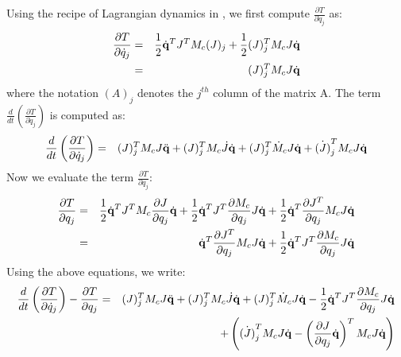 Using the recipe of Lagrangian dynamics in , we first compute $\frac{\partial T}{\partial \dot{q}_j}$ as:
\begin{eqnarray}
\nonumber
\frac{\partial T}{\partial \dot{q}_j} & = & \frac{1}{2}\dot{\mathbf{q}}^T J^T M_c (J)_j + \frac{1}{2} (J)_j^T M_c J \dot{\mathbf{q}}\\
 & = & (J)_j^T M_c J \dot{\mathbf{q}}
\end{eqnarray}
where the notation $(A)_j$ denotes the $j^{th}$ column of the matrix A. The term $\frac{d}{dt} \left( \frac{\partial T}{\partial \dot{q}_j} \right )$ is computed as:
\begin{eqnarray}
\label{eq:lagterm1}
\frac{d}{dt} \left ( \frac{\partial T}{\partial \dot{q}_j} \right ) & = & (J)_j^T M_c J \ddot{\mathbf{q}} + (J)_j^T M_c \dot{J} \dot{\mathbf{q}} + (J)_j^T \dot{M}_c J \dot{\mathbf{q}} + \dot{(J)}_j^T M_c J \dot{\mathbf{q}}
\end{eqnarray}
Now we evaluate the term $\frac{\partial T}{\partial q_j}$:
\begin{eqnarray}
\nonumber
\frac{\partial T}{\partial q_j} & = & \frac{1}{2}\dot{\mathbf{q}}^T J^T M_c \frac{\partial J}{\partial q_j} \dot{\mathbf{q}} + \frac{1}{2}\dot{\mathbf{q}}^T J^T \frac{\partial M_c}{\partial q_j} J \dot{\mathbf{q}} + \frac{1}{2}\dot{\mathbf{q}}^T \frac{\partial J^T}{\partial q_j} M_c J \dot{\mathbf{q}}\\
\label{eq:lagterm2}
& = & \dot{\mathbf{q}}^T \frac{\partial J^T}{\partial q_j} M_c J \dot{\mathbf{q}} + \frac{1}{2}\dot{\mathbf{q}}^T J^T \frac{\partial M_c}{\partial q_j} J \dot{\mathbf{q}}
\end{eqnarray}
Using the above equations, we write:
\begin{eqnarray}
\label{eq:lageqn_j}
\nonumber
\frac{d}{dt} \left ( \frac{\partial T}{\partial \dot{q}_j} \right ) - \frac{\partial T}{\partial q_j} & = & (J)_j^T M_c J \ddot{\mathbf{q}} + (J)_j^T M_c \dot{J} \dot{\mathbf{q}} + (J)_j^T \dot{M}_c J \dot{\mathbf{q}} - \frac{1}{2}\dot{\mathbf{q}}^T J^T \frac{\partial M_c}{\partial q_j} J \dot{\mathbf{q}} \\ & & + \left ( \dot{(J)}_j^T M_c J \dot{\mathbf{q}}  - \left( \frac{\partial J}{\partial q_j} \dot{\mathbf{q}}\right)^T M_c J \dot{\mathbf{q}} \right )
\end{eqnarray}

